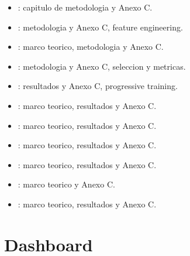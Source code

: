 \begin{itemize}
  \item {}: capitulo de metodologia y Anexo C.
  \item {}: metodologia y Anexo C, feature engineering.
  \item {}: marco teorico, metodologia y Anexo C.
  \item {}: metodologia y Anexo C, seleccion y metricas.
  \item {}: resultados y Anexo C, progressive training.
  \item {}: marco teorico, resultados y Anexo C.
  \item {}: marco teorico, resultados y Anexo C.
  \item {}: marco teorico, resultados y Anexo C.
  \item {}: marco teorico, resultados y Anexo C.
  \item {}: marco teorico y Anexo C.
  \item {}: marco teorico, resultados y Anexo C.
\end{itemize}

\section{Dashboard}

